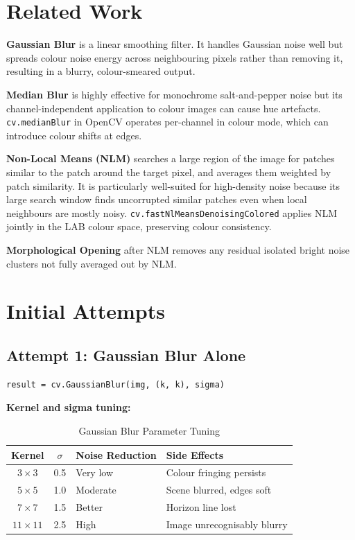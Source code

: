 \documentclass[journal]{IEEEtran}
\begin{document}
\section{Related Work}
\textbf{Gaussian Blur} is a linear smoothing filter. It handles 
Gaussian noise well but spreads colour noise energy across neighbouring pixels 
rather than removing it, resulting in a blurry, colour-smeared output.

\textbf{Median Blur} is highly effective for monochrome salt-and-pepper 
noise but its channel-independent application to colour images can cause hue artefacts. 
\texttt{cv.medianBlur} in OpenCV operates per-channel in colour mode, which can 
introduce colour shifts at edges.

\textbf{Non-Local Means (NLM)} searches a large region of the 
image for patches similar to the patch around the target pixel, and averages them 
weighted by patch similarity. It is particularly well-suited for high-density noise 
because its large search window finds uncorrupted similar patches even when local 
neighbours are mostly noisy. \texttt{cv.fastNlMeansDenoisingColored} applies NLM 
jointly in the LAB colour space, preserving colour consistency.

\textbf{Morphological Opening} after NLM removes any residual 
isolated bright noise clusters not fully averaged out by NLM.

\section{Initial Attempts}

\subsection{Attempt 1: Gaussian Blur Alone}
\begin{lstlisting}
result = cv.GaussianBlur(img, (k, k), sigma)
\end{lstlisting}

\textbf{Kernel and sigma tuning:}

\begin{table}[h]
\centering
\caption{Gaussian Blur Parameter Tuning}
\begin{tabular}{@{}ccll@{}}
\toprule
Kernel & $\sigma$ & Noise Reduction & Side Effects \\
\midrule
$3\times3$ & 0.5 & Very low & Colour fringing persists \\
$5\times5$ & 1.0 & Moderate & Scene blurred, edges soft \\
$7\times7$ & 1.5 & Better & Horizon line lost \\
$11\times11$ & 2.5 & High & Image unrecognisably blurry \\
\bottomrule
\end{tabular}
\end{table}
\end{document}
